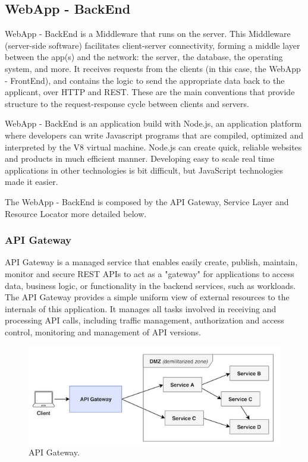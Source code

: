 \subsection{WebApp - BackEnd}\label{sec:WebAppBackEnd}
WebApp - BackEnd is a Middleware that runs on the server. This Middleware (server-side software) facilitates client-server connectivity, forming a middle layer between the app(s) and the network: the server, the database, the operating system, and more. It receives requests from the clients (in this case, the WebApp - FrontEnd), and contains the logic to send the appropriate data back to the applicant, over HTTP and REST.  These are the main conventions that provide structure to the request-response cycle between clients and servers.

WebApp - BackEnd is an application build with Node.js, an application platform where developers can write Javascript programs that are compiled, optimized and interpreted by the V8 virtual machine. Node.js can create quick, reliable websites and products in much efficient manner. Developing easy to scale real time applications in other technologies is bit difficult, but JavaScript technologies made it easier.

The WebApp - BackEnd is composed by the API Gateway, Service Layer and Resource Locator more detailed below.

\subsubsection{API Gateway}\label{sec:APIGateway}
API Gateway is a managed service that enables easily create, publish, maintain, monitor and secure REST APIs to act as a "gateway" for applications to access data, business logic, or functionality in the backend services, such as workloads. The API Gateway provides a simple uniform view of external resources to the internals of this application. It manages all tasks involved in receiving and processing API calls, including traffic management, authorization and access control, monitoring and management of API versions.

\begin{figure}[htbp]
\begin{center}
  \includegraphics[scale=0.75]{images/apigateway.png}
\caption{API Gateway.}
\label{default-regular2}
\end{center}
\end{figure}

